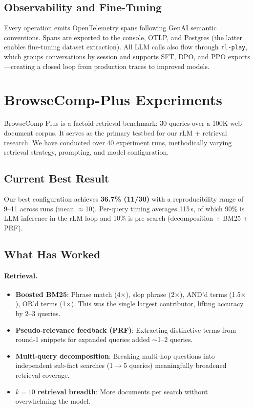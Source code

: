 \documentclass[11pt,a4paper]{article}
\begin{document}
\subsection{Observability and Fine-Tuning}

Every operation emits OpenTelemetry spans following GenAI semantic conventions.
Spans are exported to the console, OTLP, and Postgres (the latter enables
fine-tuning dataset extraction). All LLM calls also flow through
\texttt{rl-play}, which groups conversations by session and supports SFT, DPO,
and PPO exports---creating a closed loop from production traces to improved
models.

\section{BrowseComp-Plus Experiments}

BrowseComp-Plus is a factoid retrieval benchmark: 30 queries over a 100K web
document corpus. It serves as the primary testbed for our rLM + retrieval
research. We have conducted over 40 experiment runs, methodically varying
retrieval strategy, prompting, and model configuration.

\subsection{Current Best Result}

Our best configuration achieves \textbf{36.7\% (11/30)} with a reproducibility
range of 9--11 across runs (mean $\approx$10). Per-query timing averages 115\,s,
of which 90\% is LLM inference in the rLM loop and 10\% is pre-search
(decomposition + BM25 + PRF).

\subsection{What Has Worked}

\paragraph{Retrieval.}
\begin{itemize}[nosep]
  \item \textbf{Boosted BM25}: Phrase match (4$\times$), slop phrase (2$\times$),
        AND'd terms (1.5$\times$), OR'd terms (1$\times$). This was the single
        largest contributor, lifting accuracy by 2--3 queries.
  \item \textbf{Pseudo-relevance feedback (PRF)}: Extracting distinctive terms
        from round-1 snippets for expanded queries added $\sim$1--2 queries.
  \item \textbf{Multi-query decomposition}: Breaking multi-hop questions into
        independent sub-fact searches (1$\to$5 queries) meaningfully broadened
        retrieval coverage.
  \item \textbf{$k=10$ retrieval breadth}: More documents per search without
        overwhelming the model.
\end{itemize}
\end{document}
